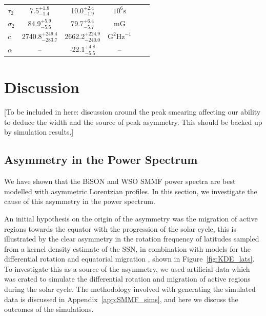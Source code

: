 \begin{table}[ht!]
\begin{center}
\begin{tabular}{l c c c c r}
			{$\tau_2$} & {7.5$_{-1.4}^{+1.8}$} & {10.0$_{-1.9}^{+2.4}$} & {$10^6 \mathrm{s}$} \\	
			
			{$\sigma_2$} & {84.9$_{-5.5}^{+5.9}$} & {79.7$_{-5.7}^{+6.4}$} & {$\mathrm{mG}$} \\	
			
			{$c$} & {2740.8$_{-283.7}^{+249.4}$} & {2662.2$_{-240.0}^{+224.9}$} & {$\mathrm{G}^2\mathrm{Hz}^{-1}$} \\	
			
			{$\alpha$} & {--} & {-22.1$_{-5.5}^{+4.8}$} & {--} \\	
			\hline
		\end{tabular}
	\end{center}
\end{table}


\section{Discussion}\label{sec:SMMF_artificial}

[To be included in here: discussion around the peak smearing affecting our ability to deduce the width and the source of peak asymmetry. This should be backed up by simulation results.]

\subsection{Asymmetry in the Power Spectrum}
\label{sec:asymmetry}

We have shown that the BiSON and WSO SMMF power spectra are best modelled with asymmetric Lorentzian profiles. In this section, we investigate the cause of this asymmetry in the power spectrum. 

An initial hypothesis on the origin of the asymmetry was the migration of active regions towards the equator with the progression of the solar cycle, this is illustrated by the clear asymmetry in the rotation frequency of latitudes sampled from a kernel density estimate of the SSN, in combination with models for the differential rotation \citep{snodgrass_magnetic_1983} and equatorial migration \citep{li_latitude_2001}, shown in Figure~\ref{fig:KDE_lats}. To investigate this as a source of the asymmetry, we used artificial data which was crated to simulate the differential rotation and migration of active regions during the solar cycle. The methodology involved with generating the simulated data is discussed in Appendix~\ref{app:SMMF_sims}, and here we discuss the outcomes of the simulations.

